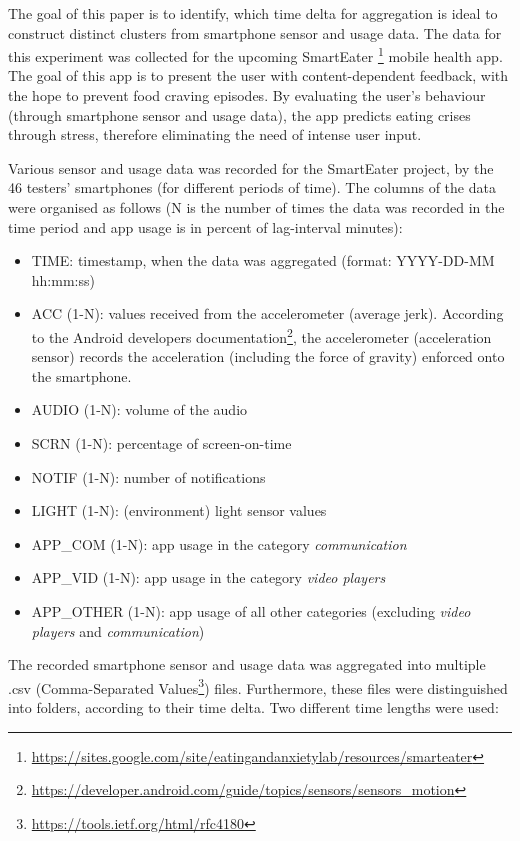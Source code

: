 The goal of this paper is to identify, which time delta for aggregation is ideal to construct distinct clusters from smartphone sensor and usage data. The data for this experiment was collected for the upcoming SmartEater \footnote{\url{https://sites.google.com/site/eatingandanxietylab/resources/smarteater}} mobile health app. The goal of this app is to present the user with content-dependent feedback, with the hope to prevent food craving episodes. By evaluating the user's behaviour (through smartphone sensor and usage data), the app predicts eating crises through stress, therefore eliminating the need of intense user input. 

Various sensor and usage data was recorded for the SmartEater project, by the 46 testers' smartphones (for different periods of time). The columns of the data were organised as follows (N is the number of times the data was recorded in the time period and app usage is in percent of lag-interval minutes):
 

\begin{itemize}
	\item TIME: timestamp, when the data was aggregated (format: YYYY-DD-MM hh:mm:ss)
	\item ACC (1-N): values received from the accelerometer (average jerk). According to the Android developers documentation\footnote{\url{https://developer.android.com/guide/topics/sensors/sensors_motion}}, the accelerometer (acceleration sensor) records the acceleration (including the force of gravity) enforced onto the smartphone. 
	\item AUDIO (1-N): volume of the audio 
	\item SCRN (1-N): percentage of screen-on-time
	\item NOTIF (1-N): number of notifications
	\item LIGHT (1-N): (environment) light sensor values
	\item APP\_COM (1-N): app usage in the category \textit{communication} 
	\item APP\_VID (1-N): app usage in the category \textit{video players}
	\item APP\_OTHER (1-N): app usage of all other categories (excluding \textit{video players} and \textit{communication})
\end{itemize}


The recorded smartphone sensor and usage data was aggregated into multiple .csv (Comma-Separated Values\footnote{\url{https://tools.ietf.org/html/rfc4180}}) files. Furthermore, these files were distinguished into folders, according to their time delta. Two different time lengths were used:

